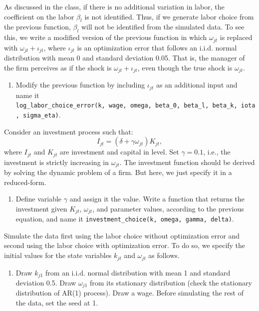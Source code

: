\documentclass[]{book}
\providecommand{\tightlist}{%
  \setlength{\itemsep}{0pt}\setlength{\parskip}{0pt}}
\begin{document}
As discussed in the class, if there is no additional variation in labor,
the coefficient on the labor \(\beta_l\) is not identified. Thus, if we
generate labor choice from the previous function, \(\beta_l\) will not
be identified from the simulated data. To see this, we write a modified
version of the previous function in which \(\omega_{jt}\) is replaced
with \(\omega_{jt} + \iota_{jt}\), where \(\iota_{jt}\) is an
optimization error that follows an i.i.d. normal distribution with mean
0 and standard deviation 0.05. That is, the manager of the firm
perceives as if the shock is \(\omega_{jt} + \iota_{jt}\), even though
the true shock is \(\omega_{jt}\).

\begin{enumerate}
\def\labelenumi{\arabic{enumi}.}
\setcounter{enumi}{3}
\tightlist
\item
  Modify the previous function by including \(\iota_{jt}\) as an
  additional input and name it
  \texttt{log\_labor\_choice\_error(k,\ wage,\ omega,\ beta\_0,\ beta\_l,\ beta\_k,\ iota,\ sigma\_eta)}.
\end{enumerate}

Consider an investment process such that: \[
I_{jt} = (\delta + \gamma \omega_{jt}) K_{jt},
\] where \(I_{jt}\) and \(K_{jt}\) are investment and capital in level.
Set \(\gamma = 0.1\), i.e., the investment is strictly increasing in
\(\omega_{jt}\). The investment function should be derived by solving
the dynamic problem of a firm. But here, we just specify it in a
reduced-form.

\begin{enumerate}
\def\labelenumi{\arabic{enumi}.}
\setcounter{enumi}{4}
\tightlist
\item
  Define variable \(\gamma\) and assign it the value. Write a function
  that returns the investment given \(K_{jt}\), \(\omega_{jt}\), and
  parameter values, according to the previous equation, and name it
  \texttt{investment\_choice(k,\ omega,\ gamma,\ delta)}.
\end{enumerate}

Simulate the data first using the labor choice without optimization
error and second using the labor choice with optimization error. To do
so, we specify the initial values for the state variables \(k_{jt}\) and
\(\omega_{jt}\) as follows.

\begin{enumerate}
\def\labelenumi{\arabic{enumi}.}
\setcounter{enumi}{5}
\tightlist
\item
  Draw \(k_{j1}\) from an i.i.d. normal distribution with mean 1 and
  standard deviation 0.5. Draw \(\omega_{j1}\) from its stationary
  distribution (check the stationary distribution of AR(1) process).
  Draw a wage. Before simulating the rest of the data, set the seed at
  1.
\end{enumerate}
\end{document}
